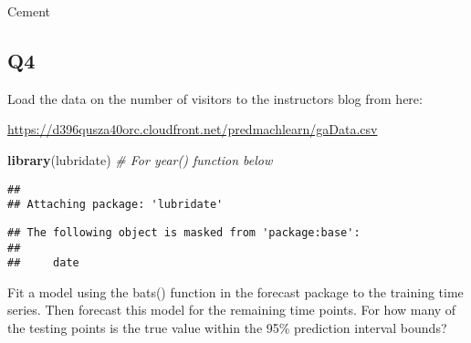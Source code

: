 \documentclass[]{article}
\newenvironment{Shaded}{\begin{snugshade}}{\end{snugshade}}
\newcommand{\KeywordTok}[1]{\textcolor[rgb]{0.13,0.29,0.53}{\textbf{#1}}}
\newcommand{\DataTypeTok}[1]{\textcolor[rgb]{0.13,0.29,0.53}{#1}}
\newcommand{\DecValTok}[1]{\textcolor[rgb]{0.00,0.00,0.81}{#1}}
\newcommand{\StringTok}[1]{\textcolor[rgb]{0.31,0.60,0.02}{#1}}
\newcommand{\CommentTok}[1]{\textcolor[rgb]{0.56,0.35,0.01}{\textit{#1}}}
\newcommand{\OperatorTok}[1]{\textcolor[rgb]{0.81,0.36,0.00}{\textbf{#1}}}
\newcommand{\NormalTok}[1]{#1}
\begin{document}
Cement

\subsection{Q4}\label{q4}

Load the data on the number of visitors to the instructors blog from
here:

\url{https://d396qusza40orc.cloudfront.net/predmachlearn/gaData.csv}

\begin{Shaded}
\begin{Highlighting}[]
\KeywordTok{library}\NormalTok{(lubridate) }\CommentTok{# For year() function below}
\end{Highlighting}
\end{Shaded}

\begin{verbatim}
## 
## Attaching package: 'lubridate'
\end{verbatim}

\begin{verbatim}
## The following object is masked from 'package:base':
## 
##     date
\end{verbatim}

\begin{Shaded}
\end{Shaded}

Fit a model using the bats() function in the forecast package to the
training time series. Then forecast this model for the remaining time
points. For how many of the testing points is the true value within the
95\% prediction interval bounds?

\begin{Shaded}
\end{Shaded}
\end{document}
